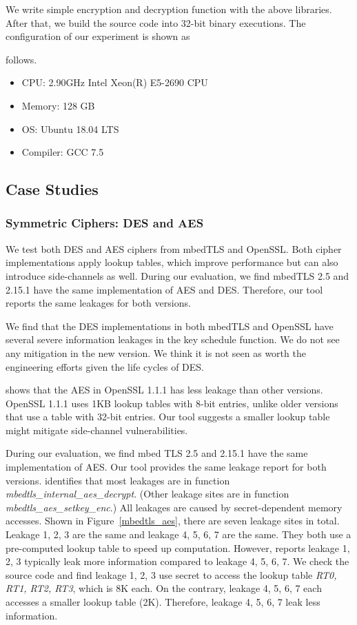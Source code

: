 We write simple encryption and decryption function with the above libraries. After that, we build
the source code into 32-bit binary executions. The configuration of our experiment is shown as
\begin{itemize}
\end{itemize}
follows.
\begin{itemize}
\item CPU: 2.90GHz Intel Xeon(R) E5-2690 CPU
\item Memory: 128 GB
\item OS: Ubuntu 18.04 LTS
\item Compiler: GCC 7.5
\end{itemize}


\subsection{Case Studies}

\subsubsection{Symmetric Ciphers: DES and AES}\label{eval:sym}
We test both DES and AES ciphers from mbedTLS and OpenSSL\@. Both cipher implementations apply lookup tables, which improve performance but can also introduce side-channels as well. During our evaluation, we find mbedTLS 2.5 and 2.15.1 have the same implementation of AES and DES\@. Therefore, our tool reports the same leakages for both versions.

We find that the DES implementations in both mbedTLS and OpenSSL have several severe information leakages in the key schedule function. We do not see any mitigation
in the new version. We think it is not seen as worth the engineering efforts given the life cycles of DES\@.

\tool{} shows that the AES in OpenSSL 1.1.1 has less leakage than other versions.
OpenSSL 1.1.1 uses 1KB lookup tables with 8-bit entries, unlike older versions that use a table with 32-bit entries. Our tool suggests a smaller lookup table might mitigate side-channel vulnerabilities.

During our evaluation, we find mbed TLS 2.5 and 2.15.1 have the same
implementation of AES\@. Our tool provides the same leakage report for both
versions. \tool{} identifies that most leakages are in function
\emph{mbedtls\_internal\_aes\_decrypt}. (Other leakage sites are in function
\emph{mbedtls\_aes\_setkey\_enc}.) All leakages are caused by secret-dependent
memory accesses. Shown in Figure~\ref{mbedtls_aes}, there are seven leakage
sites in total. Leakage 1, 2, 3 are the same and leakage 4, 5, 6, 7 are the
same. They both use a pre-computed lookup table to speed up computation.
However, \tool{} reports leakage 1, 2, 3 typically leak more information
compared to leakage 4, 5, 6, 7. We check the source code and find leakage 1, 2,
3 use secret to access the lookup table \emph{RT0, RT1, RT2, RT3}, which is 8K
each. On the contrary, leakage 4, 5, 6, 7 each accesses a smaller lookup table
(2K). Therefore, leakage 4, 5, 6, 7 leak less information.

